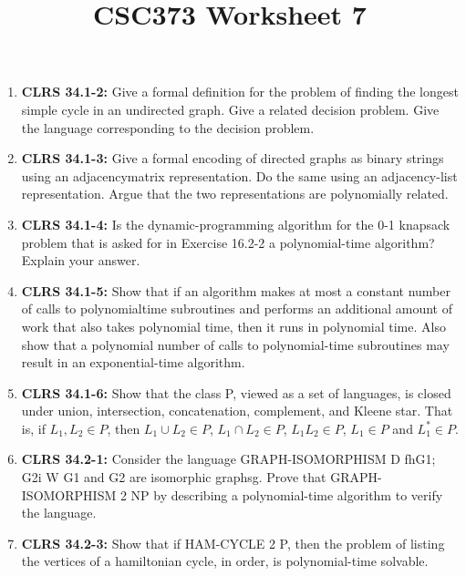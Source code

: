 \documentclass[12pt]{article}
\begin{document}
\title{CSC373 Worksheet 7}
\maketitle

\begin{enumerate}[1.]
    \item \textbf{CLRS 34.1-2:} Give a formal definition for the problem of finding the longest simple cycle in an
    undirected graph. Give a related decision problem. Give the language corresponding
    to the decision problem.

    \item \textbf{CLRS 34.1-3:} Give a formal encoding of directed graphs as binary strings using an adjacencymatrix
    representation. Do the same using an adjacency-list representation. Argue
    that the two representations are polynomially related.

    \item \textbf{CLRS 34.1-4:} Is the dynamic-programming algorithm for the 0-1 knapsack problem that is asked
    for in Exercise 16.2-2 a polynomial-time algorithm? Explain your answer.

    \item \textbf{CLRS 34.1-5:} Show that if an algorithm makes at most a constant number of calls to polynomialtime
    subroutines and performs an additional amount of work that also takes polynomial
    time, then it runs in polynomial time. Also show that a polynomial number of
    calls to polynomial-time subroutines may result in an exponential-time algorithm.

    \item \textbf{CLRS 34.1-6:} Show that the class P, viewed as a set of languages, is closed under union, intersection,
    concatenation, complement, and Kleene star. That is, if $L_1, L_2 \in P$, then
    $L_1 \cup L_2 \in P$, $L_1 \cap L_2 \in P$, $L_1L_2 \in P$, $L_1 \in P$ and $L_1^* \in P$.

    \item \textbf{CLRS 34.2-1:}
    Consider the language GRAPH-ISOMORPHISM D fhG1; G2i W G1 and G2 are
    isomorphic graphsg. Prove that GRAPH-ISOMORPHISM 2 NP by describing a
    polynomial-time algorithm to verify the language.

    \item \textbf{CLRS 34.2-3:}
    Show that if HAM-CYCLE 2 P, then the problem of listing the vertices of a
    hamiltonian cycle, in order, is polynomial-time solvable.


\end{enumerate}
\end{document}
